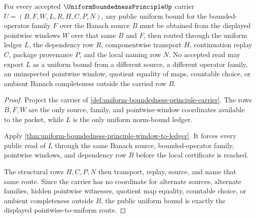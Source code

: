 \begin{theorem}
\label{thm:uniform-boundedness-principle-pointwise-to-uniform-bound}
For every accepted $\UniformBoundednessPrincipleUp$ carrier $U=(B,F,W,L,R,H,C,P,N)$, any public uniform bound for the bounded-operator family $F$ over the Banach source $B$ must be obtained from the displayed pointwise windows $W$ over that same $B$ and $F$, then routed through the uniform ledger $L$, the dependency row $R$, componentwise transport $H$, continuation replay $C$, package provenance $P$, and the local naming row $N$. No accepted read may export $L$ as a uniform bound from a different source, a different operator family, an uninspected pointwise window, quotient equality of maps, countable choice, or ambient Banach completeness outside the carried row $B$.
\end{theorem}
\begin{proof}
Project the carrier of \autoref{def:uniform-boundedness-principle-carrier}. The rows $B,F,W$ are the only source, family, and pointwise-window coordinates available to the packet, while $L$ is the only uniform norm-bound ledger.

Apply \autoref{thm:uniform-boundedness-principle-window-to-ledger}. It forces every public read of $L$ through the same Banach source, bounded-operator family, pointwise windows, and dependency row $R$ before the local certificate is reached.

The structural rows $H,C,P,N$ then transport, replay, source, and name that same route. Since the carrier has no coordinate for alternate sources, alternate families, hidden pointwise witnesses, quotient map equality, countable choice, or ambient completeness outside $B$, the public uniform bound is exactly the displayed pointwise-to-uniform route.
\end{proof}



